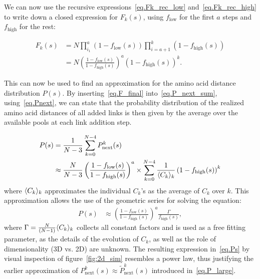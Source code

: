 \documentclass[10pt]{iopart}
\DeclarePairedDelimiter{\evdel}{\langle}{\rangle}
\newcommand{\Pin}{P_{\mathrm{next}}}
\newcommand{\fhigh}{f_{\mathrm{high}}}
\newcommand{\flow}{f_{\mathrm{low}}}
\begin{document}
We can now use the recursive expressions~\ref{eq.Fk_rec_low} and~\ref{eq.Fk_rec_high} to write down a closed expression for $F_k(s)$, using $\flow$ for the first $a$ steps and $\fhigh$ for the rest:

\begin{align}
    F_k(s)&=N\prod_{i_1}^a\left(1-\flow(s)\right)\prod_{i=a+1}^k\left(1-\fhigh(s)\right) \nonumber \\
    &= N\left(\frac{1-\flow(s)}{1-\fhigh(s)}\right)^a\left(1-\fhigh(s)\right)^{k}.
    \label{eq.F_final}
\end{align}

This can now be used to find an approximation for the amino acid distance distribution $P(s)$. By inserting~\ref{eq.F_final} into~\ref{eq.P_next_sum}, using~\ref{eq.Pnext}, we can state that the probability distribution of the realized amino acid distances of all added links is then given by the average over the available pools at each link addition step.

\begin{align}
    P(s)&=\frac{1}{N-3}\sum_{k=0}^{N-4} \Pin^k(s)  \\
    &\approx \frac{N}{N-3}\left(\frac{1-\flow(s)}{1-\fhigh(s)}\right)^a %
\times \sum_{k=0}^{N-4} \frac{1}{\evdel{C_k}_k}\nonumber \left(1-\fhigh(s)\right)^{k} 
\end{align}
where $\evdel{C_k}_k$ approximates the individual $C_k$'s as the average of $C_k$ over $k$.
This approximation allows the use of the geometric series for solving the equation:
\begin{align}
    P(s)&\approx \left(\frac{1-\flow(s)}{1-\fhigh(s)}\right)^a\frac{\Gamma}{\fhigh(s)},
    \label{eq.Ps}
\end{align}
where $\Gamma=\frac{N}{(N-1)}\evdel{C_k}_k$ collects all constant factors and is used as a free fitting parameter, as the details of the evolution of $C_k$, as well as the role of dimensionality (3D vs. 2D) are unknown.
The resulting expression in~\ref{eq.Ps} by visual inspection of figure~\ref{fig:2d_sim} resembles a power law, thus justifying the earlier approximation of $\Pin^k(s)\approx\tilde{P}_{\text{next}}^k(s)$ introduced in~\ref{eq.P_large}.
\end{document}
